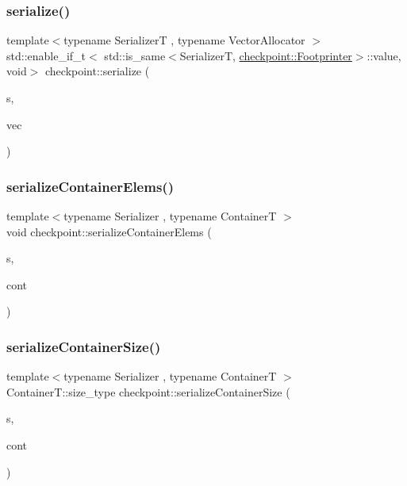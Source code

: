 \subsubsection{\texorpdfstring{serialize()}{serialize()}\hspace{0.1cm}{\footnotesize\ttfamily [29/29]}}
{\footnotesize\ttfamily template$<$typename SerializerT , typename Vector\+Allocator $>$ \\
std\+::enable\+\_\+if\+\_\+t$<$ std\+::is\+\_\+same$<$SerializerT, \hyperlink{structcheckpoint_1_1_footprinter}{checkpoint\+::\+Footprinter}$>$\+::value, void$>$ checkpoint\+::serialize (\begin{DoxyParamCaption}\item[{SerializerT \&}]{s,  }\item[{std\+::vector$<$ bool, Vector\+Allocator $>$ \&}]{vec }\end{DoxyParamCaption})}

\mbox{\label{namespacecheckpoint_a9c880ba9bb9a106e784e06554b2fbcf2}} 
\subsubsection{\texorpdfstring{serialize\+Container\+Elems()}{serializeContainerElems()}}
{\footnotesize\ttfamily template$<$typename Serializer , typename ContainerT $>$ \\
void checkpoint\+::serialize\+Container\+Elems (\begin{DoxyParamCaption}\item[{\hyperlink{structcheckpoint_1_1_serializer}{Serializer} \&}]{s,  }\item[{ContainerT \&}]{cont }\end{DoxyParamCaption})\hspace{0.3cm}{\ttfamily [inline]}}

\mbox{\label{namespacecheckpoint_a3359595d5a4c6fcf5fc95069c71f869b}} 
\subsubsection{\texorpdfstring{serialize\+Container\+Size()}{serializeContainerSize()}}
{\footnotesize\ttfamily template$<$typename Serializer , typename ContainerT $>$ \\
Container\+T\+::size\+\_\+type checkpoint\+::serialize\+Container\+Size (\begin{DoxyParamCaption}\item[{\hyperlink{structcheckpoint_1_1_serializer}{Serializer} \&}]{s,  }\item[{ContainerT \&}]{cont }\end{DoxyParamCaption})\hspace{0.3cm}{\ttfamily [inline]}}

